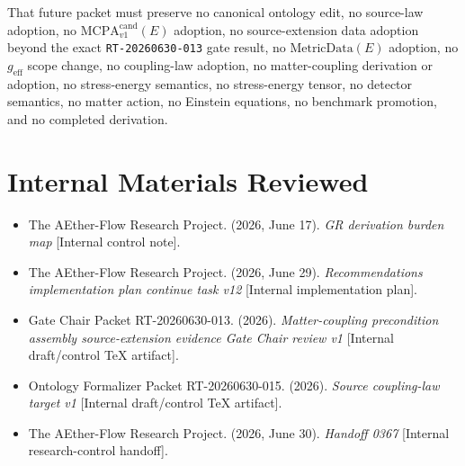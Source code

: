 \documentclass[11pt]{article}
\newcommand{\MetricData}{\mathrm{MetricData}}
\newcommand{\geff}{g_{\mathrm{eff}}}
\newcommand{\MCPA}{\mathrm{MCPA}^{\mathrm{cand}}_{v1}}
\begin{document}
That future packet must preserve no canonical ontology edit, no source-law
adoption, no \(\MCPA(E)\) adoption, no source-extension data adoption beyond
the exact \texttt{RT-20260630-013} gate result, no \(\MetricData(E)\)
adoption, no \(\geff\) scope change, no coupling-law adoption, no
matter-coupling derivation or adoption, no stress-energy semantics, no
stress-energy tensor, no detector semantics, no matter action, no Einstein
equations, no benchmark promotion, and no completed derivation.

\section{Internal Materials Reviewed}

\begin{itemize}[leftmargin=2em]
\item The AEther-Flow Research Project. (2026, June 17). \textit{GR derivation burden map} [Internal control note].
\item The AEther-Flow Research Project. (2026, June 29). \textit{Recommendations implementation plan continue task v12} [Internal implementation plan].
\item Gate Chair Packet RT-20260630-013. (2026). \textit{Matter-coupling precondition assembly source-extension evidence Gate Chair review v1} [Internal draft/control TeX artifact].
\item Ontology Formalizer Packet RT-20260630-015. (2026). \textit{Source coupling-law target v1} [Internal draft/control TeX artifact].
\item The AEther-Flow Research Project. (2026, June 30). \textit{Handoff 0367} [Internal research-control handoff].
\end{itemize}
\end{document}
